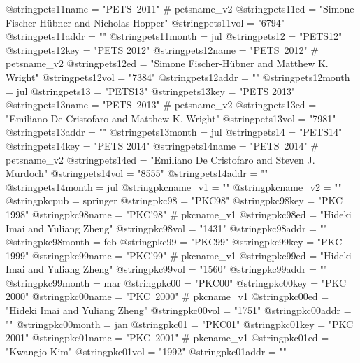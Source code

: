 @string{pets11name =            "PETS~2011" # petsname_v2}
@string{pets11ed =              "Simone {Fischer-H{\"u}bner} and Nicholas Hopper"}
@string{pets11vol =             "6794"}
@string{pets11addr =            ""}
@string{pets11month =           jul}
@string{pets12 =                "PETS12"}
@string{pets12key =             "PETS 2012"}
@string{pets12name =            "PETS~2012" # petsname_v2}
@string{pets12ed =              "Simone {Fischer-H{\"u}bner} and Matthew K. Wright"}
@string{pets12vol =             "7384"}
@string{pets12addr =            ""}
@string{pets12month =           jul}
@string{pets13 =                "PETS13"}
@string{pets13key =             "PETS 2013"}
@string{pets13name =            "PETS~2013" # petsname_v2}
@string{pets13ed =              "Emiliano {De Cristofaro} and Matthew K. Wright"}
@string{pets13vol =             "7981"}
@string{pets13addr =            ""}
@string{pets13month =           jul}
@string{pets14 =                "PETS14"}
@string{pets14key =             "PETS 2014"}
@string{pets14name =            "PETS~2014" # petsname_v2}
@string{pets14ed =              "Emiliano {De Cristofaro} and Steven J. Murdoch"}
@string{pets14vol =             "8555"}
@string{pets14addr =            ""}
@string{pets14month =           jul}
@string{pkcname_v1 =            ""}
@string{pkcname_v2 =            ""}
@string{pkcpub =                springer}
@string{pkc98 =                 "PKC98"}
@string{pkc98key =              "PKC 1998"}
@string{pkc98name =             "PKC'98" # pkcname_v1}
@string{pkc98ed =               "Hideki Imai and Yuliang Zheng"}
@string{pkc98vol =              "1431"}
@string{pkc98addr =             ""}
@string{pkc98month =            feb}
@string{pkc99 =                 "PKC99"}
@string{pkc99key =              "PKC 1999"}
@string{pkc99name =             "PKC'99" # pkcname_v1}
@string{pkc99ed =               "Hideki Imai and Yuliang Zheng"}
@string{pkc99vol =              "1560"}
@string{pkc99addr =             ""}
@string{pkc99month =            mar}
@string{pkc00 =                 "PKC00"}
@string{pkc00key =              "PKC 2000"}
@string{pkc00name =             "PKC~2000" # pkcname_v1}
@string{pkc00ed =               "Hideki Imai and Yuliang Zheng"}
@string{pkc00vol =              "1751"}
@string{pkc00addr =             ""}
@string{pkc00month =            jan}
@string{pkc01 =                 "PKC01"}
@string{pkc01key =              "PKC 2001"}
@string{pkc01name =             "PKC~2001" # pkcname_v1}
@string{pkc01ed =               "Kwangjo Kim"}
@string{pkc01vol =              "1992"}
@string{pkc01addr =             ""}
